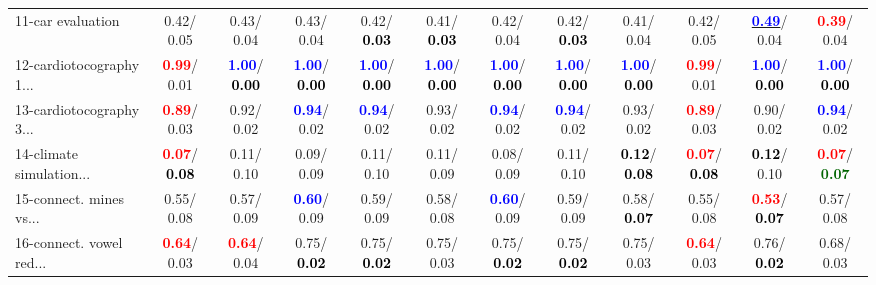 \begin{table}[h]
\begin{center}
{\begin{tabular}{lc|c|c|c|c|c|c|c|c|c|c}
11-car evaluation &   0.42/  0.05 &   0.43/  0.04 &   0.43/  0.04 &   0.42/\textcolor{black}{\textbf{  0.03}} &   0.41/\textcolor{black}{\textbf{  0.03}} &   0.42/  0.04 &   0.42/\textcolor{black}{\textbf{  0.03}} &   0.41/  0.04 &   0.42/  0.05 & \underline{\textcolor{blue}{\textbf{  0.49}}}/  0.04 & \textcolor{red}{\textbf{  0.39}}/  0.04 \\
12-cardiotocography 1... & \textcolor{red}{\textbf{  0.99}}/  0.01 & \textcolor{blue}{\textbf{  1.00}}/\textcolor{black}{\textbf{  0.00}} & \textcolor{blue}{\textbf{  1.00}}/\textcolor{black}{\textbf{  0.00}} & \textcolor{blue}{\textbf{  1.00}}/\textcolor{black}{\textbf{  0.00}} & \textcolor{blue}{\textbf{  1.00}}/\textcolor{black}{\textbf{  0.00}} & \textcolor{blue}{\textbf{  1.00}}/\textcolor{black}{\textbf{  0.00}} & \textcolor{blue}{\textbf{  1.00}}/\textcolor{black}{\textbf{  0.00}} & \textcolor{blue}{\textbf{  1.00}}/\textcolor{black}{\textbf{  0.00}} & \textcolor{red}{\textbf{  0.99}}/  0.01 & \textcolor{blue}{\textbf{  1.00}}/\textcolor{black}{\textbf{  0.00}} & \textcolor{blue}{\textbf{  1.00}}/\textcolor{black}{\textbf{  0.00}} \\
13-cardiotocography 3... & \textcolor{red}{\textbf{  0.89}}/  0.03 &   0.92/  0.02 & \textcolor{blue}{\textbf{  0.94}}/  0.02 & \textcolor{blue}{\textbf{  0.94}}/  0.02 &   0.93/  0.02 & \textcolor{blue}{\textbf{  0.94}}/  0.02 & \textcolor{blue}{\textbf{  0.94}}/  0.02 &   0.93/  0.02 & \textcolor{red}{\textbf{  0.89}}/  0.03 &   0.90/  0.02 & \textcolor{blue}{\textbf{  0.94}}/  0.02 \\
14-climate simulation... & \textcolor{red}{\textbf{  0.07}}/\textcolor{black}{\textbf{  0.08}} &   0.11/  0.10 &   0.09/  0.09 &   0.11/  0.10 &   0.11/  0.09 &   0.08/  0.09 &   0.11/  0.10 & \textcolor{black}{\textbf{  0.12}}/\textcolor{black}{\textbf{  0.08}} & \textcolor{red}{\textbf{  0.07}}/\textcolor{black}{\textbf{  0.08}} & \textcolor{black}{\textbf{  0.12}}/  0.10 & \textcolor{red}{\textbf{  0.07}}/\textcolor{darkgreen}{\textbf{  0.07}} \\ \hline
15-connect. mines vs... &   0.55/  0.08 &   0.57/  0.09 & \textcolor{blue}{\textbf{  0.60}}/  0.09 &   0.59/  0.09 &   0.58/  0.08 & \textcolor{blue}{\textbf{  0.60}}/  0.09 &   0.59/  0.09 &   0.58/\textcolor{black}{\textbf{  0.07}} &   0.55/  0.08 & \textcolor{red}{\textbf{  0.53}}/\textcolor{black}{\textbf{  0.07}} &   0.57/  0.08 \\
16-connect. vowel red... & \textcolor{red}{\textbf{  0.64}}/  0.03 & \textcolor{red}{\textbf{  0.64}}/  0.04 &   0.75/\textcolor{black}{\textbf{  0.02}} &   0.75/\textcolor{black}{\textbf{  0.02}} &   0.75/  0.03 &   0.75/\textcolor{black}{\textbf{  0.02}} &   0.75/\textcolor{black}{\textbf{  0.02}} &   0.75/  0.03 & \textcolor{red}{\textbf{  0.64}}/  0.03 &   0.76/\textcolor{black}{\textbf{  0.02}} &   0.68/  0.03 \\

\end{tabular}}
\end{center}
\end{table}
